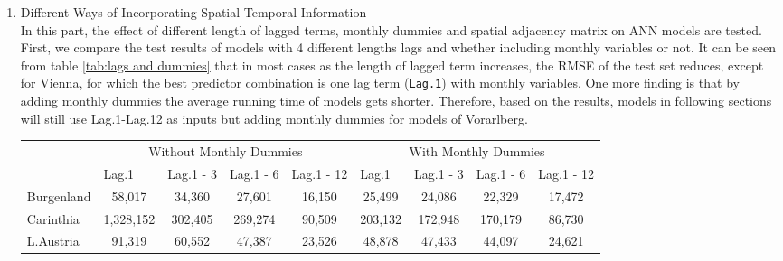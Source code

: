 \documentclass[a4paper,reqno,]{article}
\begin{document}
\begin{enumerate}
    \item Different Ways of Incorporating Spatial-Temporal Information
    \\In this part, the effect of different length of lagged terms, monthly dummies and spatial adjacency matrix on ANN models are tested. First, we compare the test results of models with 4 different lengths lags and whether including monthly variables or not. It can be seen from table \ref{tab:lags and dummies} that in most cases as the length of lagged term increases,  the RMSE of the test set reduces, except for Vienna, for which the best predictor combination is one lag term (\texttt{Lag.1}) with monthly variables. One more finding is that by adding monthly dummies the average running time of models gets shorter. Therefore, based on the results, models in following sections will still use Lag.1-Lag.12 as inputs but adding monthly dummies for models of Vorarlberg.
    \begin{table}[H]
      \centering
        \begin{tabular}{lcccccccc}
        \toprule
         & \multicolumn{4}{c}{Without Monthly Dummies} & \multicolumn{4}{c}{With Monthly Dummies} \\
         \cmidrule(lr){2-5}\cmidrule(lr){6-9}
         & \multicolumn{1}{l}{Lag.1} & \multicolumn{1}{l}{Lag.1 - 3} & \multicolumn{1}{l}{Lag.1 - 6} & \multicolumn{1}{l}{Lag.1 - 12} & \multicolumn{1}{l}{Lag.1} & \multicolumn{1}{l}{Lag.1 - 3} & \multicolumn{1}{l}{Lag.1 - 6} & \multicolumn{1}{l}{Lag.1 - 12} \\
        \midrule
        Burgenland & \cellcolor[rgb]{ .973,  .412,  .42}58,017 & \cellcolor[rgb]{ .992,  .776,  .49}34,360 & \cellcolor[rgb]{ 1,  .882,  .51}27,601 & \cellcolor[rgb]{ .388,  .745,  .482}16,150 & \cellcolor[rgb]{ 1,  .914,  .518}25,499 & \cellcolor[rgb]{ .949,  .906,  .514}24,086 & \cellcolor[rgb]{ .824,  .871,  .506}22,329 & \cellcolor[rgb]{ .478,  .769,  .486}17,472 \\
        Carinthia & \cellcolor[rgb]{ .973,  .412,  .42}1,328,152 & \cellcolor[rgb]{ 1,  .871,  .51}302,405 & \cellcolor[rgb]{ 1,  .886,  .514}269,274 & \cellcolor[rgb]{ .408,  .749,  .482}90,509 & \cellcolor[rgb]{ 1,  .918,  .518}203,132 & \cellcolor[rgb]{ .906,  .894,  .51}172,948 & \cellcolor[rgb]{ .89,  .89,  .51}170,179 & \cellcolor[rgb]{ .388,  .745,  .482}86,730 \\
        L.Austria & \cellcolor[rgb]{ .973,  .412,  .42} 91,319 & \cellcolor[rgb]{ .992,  .773,  .49}60,552 & \cellcolor[rgb]{ .996,  .918,  .514}47,387 & \cellcolor[rgb]{ .388,  .745,  .482}23,526 & \cellcolor[rgb]{ 1,  .906,  .518}48,878 & \cellcolor[rgb]{ 1,  .922,  .518}47,433 & \cellcolor[rgb]{ .914,  .894,  .51}44,097 & \cellcolor[rgb]{ .416,  .753,  .482}24,621 \\

\end{tabular}
\end{table}
\end{enumerate}
\end{document}
